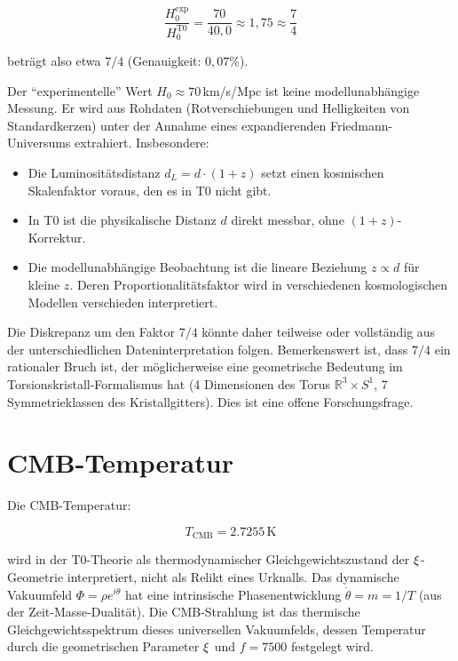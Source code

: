 \begin{equation}
\frac{H_0^{\text{exp}}}{H_0^{\text{T0}}} = \frac{70}{40{,}0} \approx 1{,}75 \approx \frac{7}{4}
\label{eq:H0_ratio}
\end{equation}

beträgt also etwa $7/4$ (Genauigkeit: $0{,}07\%$).

\begin{remark}
	Der ``experimentelle'' Wert $H_0 \approx 70\,$km/s/Mpc ist keine 
	modellunabhängige Messung. Er wird aus Rohdaten (Rotverschiebungen und 
	Helligkeiten von Standardkerzen) unter der Annahme eines expandierenden 
	Friedmann-Universums extrahiert. Insbesondere:
	\begin{itemize}
	\item Die Luminositätsdistanz $d_L = d \cdot (1+z)$ setzt einen 
	kosmischen Skalenfaktor voraus, den es in T0 nicht gibt.
	\item In T0 ist die physikalische Distanz $d$ direkt messbar, ohne 
	$(1+z)$-Korrektur.
	\item Die modellunabhängige Beobachtung ist die lineare Beziehung 
	$z \propto d$ für kleine $z$. Deren Proportionalitätsfaktor wird 
	in verschiedenen kosmologischen Modellen verschieden interpretiert.
	\end{itemize}
	Die Diskrepanz um den Faktor $7/4$ könnte daher teilweise oder vollständig 
	aus der unterschiedlichen Dateninterpretation folgen. Bemerkenswert ist, 
	dass $7/4$ ein rationaler Bruch ist, der möglicherweise eine geometrische 
	Bedeutung im Torsionskristall-Formalismus hat (4 Dimensionen des Torus 
	$\mathbb{R}^3 \times S^1$, 7 Symmetrieklassen des Kristallgitters). 
	Dies ist eine offene Forschungsfrage.
\end{remark}

\section{CMB-Temperatur}

Die CMB-Temperatur:

\begin{equation}
T_{\text{CMB}} = 2.7255\,\text{K}
\end{equation}

wird in der T0-Theorie als thermodynamischer Gleichgewichtszustand der 
$\xi$-Geometrie interpretiert, nicht als Relikt eines Urknalls. Das 
dynamische Vakuumfeld $\Phi = \rho e^{i\theta}$ hat eine intrinsische 
Phasenentwicklung $\dot{\theta} = m = 1/T$ (aus der Zeit-Masse-Dualität). 
Die CMB-Strahlung ist das thermische Gleichgewichtsspektrum dieses 
universellen Vakuumfelds, dessen Temperatur durch die geometrischen 
Parameter $\xi$ und $f = 7500$ festgelegt wird.

